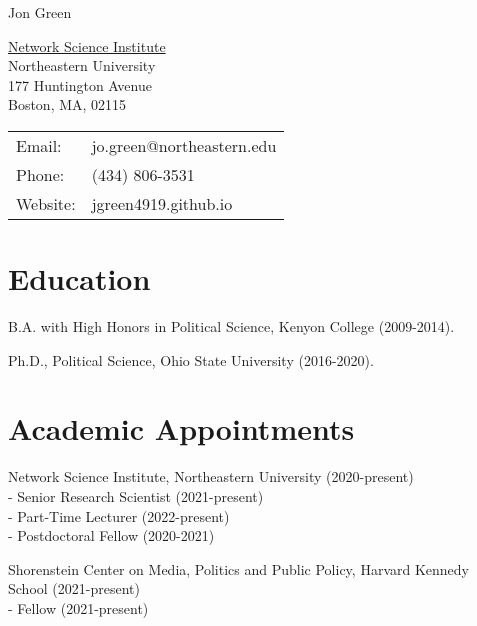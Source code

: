 \documentclass[letterpaper]{article}
\def\name{Jon Green}
\renewenvironment{itemize}{
  \begin{list}{}{
    \setlength{\leftmargin}{1.5em}
  }
}{
  \end{list}
}
\begin{document}
{\huge \name}


\vspace{0.25in}

\begin{minipage}{0.45\linewidth}
  \href{https://www.lazerlab.net/}{Network Science Institute} \\
    Northeastern University \\
    177 Huntington Avenue \\
  Boston, MA, 02115
\end{minipage}
\begin{minipage}{0.45\linewidth}
  \begin{tabular}{ll}
    Email: & jo.green@northeastern.edu \\
    Phone: & (434) 806-3531 \\
    Website: & jgreen4919.github.io \\
  \end{tabular}
\end{minipage}

\section*{Education}

\begin{itemize}
  \item B.A. with High Honors in Political Science, Kenyon College (2009-2014).
  \item Ph.D., Political Science, Ohio State University (2016-2020). 
\end{itemize}

\section*{Academic Appointments}

\begin{itemize}

\item Network Science Institute, Northeastern University (2020-present)\\
- Senior Research Scientist (2021-present)\\
- Part-Time Lecturer (2022-present)\\
- Postdoctoral Fellow (2020-2021)

\item Shorenstein Center on Media, Politics and Public Policy, Harvard Kennedy School (2021-present)\\
- Fellow (2021-present)
\end{itemize}
\end{document}
